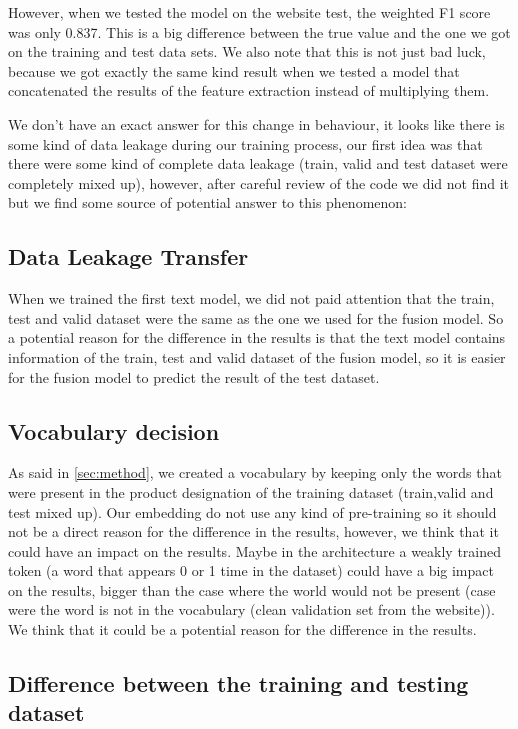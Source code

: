 However, when we tested the model on the website test, the weighted F1
score was only 0.837. This is a big difference between the true value and the
one we got on the training and test data sets. We also note that this is not just
bad luck, because we got exactly the same kind result when we tested a model
that concatenated the results of the feature extraction instead of multiplying
them.

We don’t have an exact answer for this change in behaviour, it looks like
there is some kind of data leakage during our training process, our first idea
was that there were some kind of complete data leakage (train, valid and test
dataset were completely mixed up), however, after careful review of the code we
did not find it but we find some source of potential answer to this phenomenon:

\subsection{Data Leakage Transfer}

When we trained the first text model, we did not paid attention that the train, test and valid dataset were the same as the one we used for the fusion model. So a potential reason for the difference in the results is that the text model contains information of the train, test and valid dataset of the fusion model, so it is easier for the fusion model to predict the result of the test dataset.

\subsection{Vocabulary decision}

As said in \ref{sec:method}, we created a vocabulary by keeping only the words that were present in the product designation of the training dataset (train,valid and test mixed up). Our embedding do not use any kind of pre-training so it should not be a direct reason for the difference in the results, however, we think that it could have an impact on the results. Maybe in the architecture a weakly trained token (a word that appears 0 or 1 time in the dataset) could have a big impact on the results, bigger than the case where the world would not be present (case were the word is not in the vocabulary (clean validation set from the website)). We think that it could be a potential reason for the difference in the results.


\subsection{Difference between the training and testing dataset}

